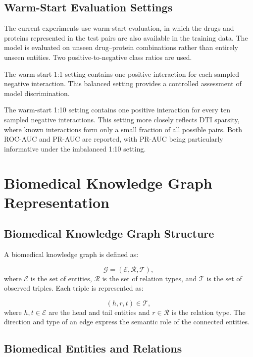 \subsection{Warm-Start Evaluation Settings}

The current experiments use warm-start evaluation, in which the drugs and
proteins represented in the test pairs are also available in the training
data. The model is evaluated on unseen drug--protein combinations rather than
entirely unseen entities. Two positive-to-negative class ratios are used.

The warm-start 1:1 setting contains one positive interaction for each sampled
negative interaction. This balanced setting provides a controlled assessment
of model discrimination.

The warm-start 1:10 setting contains one positive interaction for every ten
sampled negative interactions. This setting more closely reflects DTI sparsity,
where known interactions form only a small fraction of all possible pairs. Both
ROC-AUC and PR-AUC are reported, with PR-AUC being particularly informative
under the imbalanced 1:10 setting.

\section{Biomedical Knowledge Graph Representation}

\subsection{Biomedical Knowledge Graph Structure}

A biomedical knowledge graph is defined as:

\begin{equation}
    \mathcal{G}
    =
    (\mathcal{E},\mathcal{R},\mathcal{T}),
\end{equation}
where $\mathcal{E}$ is the set of entities, $\mathcal{R}$ is the set of
relation types, and $\mathcal{T}$ is the set of observed triples. Each triple
is represented as:

\begin{equation}
    (h,r,t) \in \mathcal{T},
\end{equation}
where $h,t\in\mathcal{E}$ are the head and tail entities and
$r\in\mathcal{R}$ is the relation type. The direction and type of an edge
express the semantic role of the connected entities.

\subsection{Biomedical Entities and Relations}

